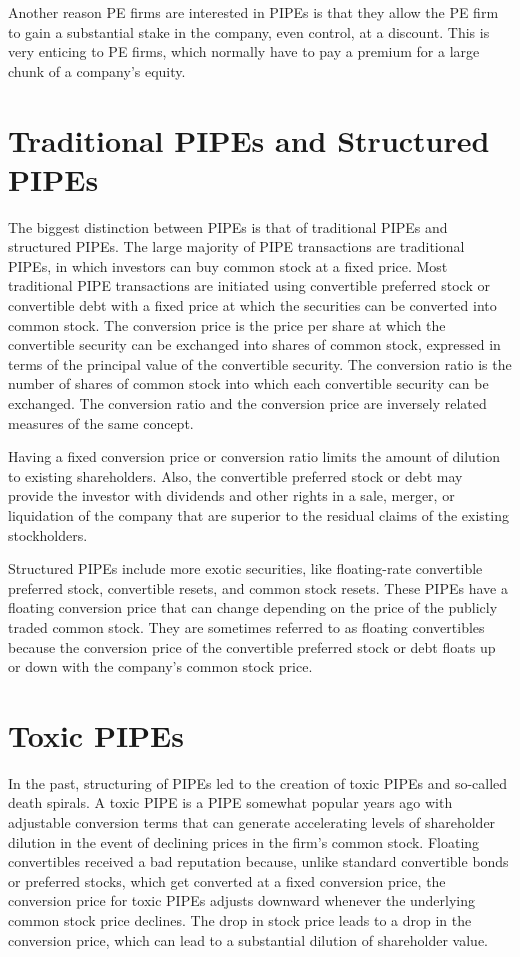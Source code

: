\documentclass[11pt]{article}
\begin{document}
Another reason PE firms are interested in PIPEs is that they allow the PE firm to gain a substantial stake in the company, even control, at a discount. This is very enticing to PE firms, which normally have to pay a premium for a large chunk of a company's equity.

\section*{Traditional PIPEs and Structured PIPEs}
The biggest distinction between PIPEs is that of traditional PIPEs and structured PIPEs. The large majority of PIPE transactions are traditional PIPEs, in which investors can buy common stock at a fixed price. Most traditional PIPE transactions are initiated using convertible preferred stock or convertible debt with a fixed price at which the securities can be converted into common stock. The conversion price is the price per share at which the convertible security can be exchanged into shares of common stock, expressed in terms of the principal value of the convertible security. The conversion ratio is the number of shares of common stock into which each convertible security can be exchanged. The conversion ratio and the conversion price are inversely related measures of the same concept.

Having a fixed conversion price or conversion ratio limits the amount of dilution to existing shareholders. Also, the convertible preferred stock or debt may provide the investor with dividends and other rights in a sale, merger, or liquidation of the company that are superior to the residual claims of the existing stockholders.

Structured PIPEs include more exotic securities, like floating-rate convertible preferred stock, convertible resets, and common stock resets. These PIPEs have a floating conversion price that can change depending on the price of the publicly traded common stock. They are sometimes referred to as floating convertibles because the conversion price of the convertible preferred stock or debt floats up or down with the company's common stock price.

\section*{Toxic PIPEs}
In the past, structuring of PIPEs led to the creation of toxic PIPEs and so-called death spirals. A toxic PIPE is a PIPE somewhat popular years ago with adjustable conversion terms that can generate accelerating levels of shareholder dilution in the event of declining prices in the firm's common stock. Floating convertibles received a bad reputation because, unlike standard convertible bonds or preferred stocks, which get converted at a fixed conversion price, the conversion price for toxic PIPEs adjusts downward whenever the underlying common stock price declines. The drop in stock price leads to a drop in the conversion price, which can lead to a substantial dilution of shareholder value.
\end{document}
